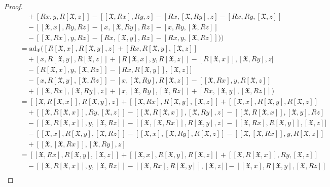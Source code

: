 \documentclass[12pt]{amsart}
\theoremstyle{definition}
\begin{document}
\begin{proof}
\begin{align*}
\quad&\quad +[Rx, y, R[\mathfrak{X}, z]]-[[\mathfrak{X},Rx], Ry, z] -[Rx, [\mathfrak{X},Ry], z]-[Rx, Ry, [\mathfrak{X},z]]\\
\quad&\quad-[[\mathfrak{X}, x], Ry, Rz]-[x, [\mathfrak{X}, Ry], Rz]-[x, Ry, [\mathfrak{X}, Rz]]\\
\quad&\quad-[[\mathfrak{X},Rx], y, Rz]-[Rx, [\mathfrak{X},y], Rz]-[Rx, y, [\mathfrak{X},Rz]])\Big)\\
&=\mathrm{ad}_\mathfrak{X}\Big( [R[\mathfrak{X}, x], R[\mathfrak{X}, y], z]+[Rx, R[\mathfrak{X}, y], [\mathfrak{X}, z]]\\
\quad&\quad+[x, R[\mathfrak{X}, y], R[\mathfrak{X}, z]]+[R[\mathfrak{X}, x], y, R[\mathfrak{X}, z]]-[ R[\mathfrak{X}, x]],[\mathfrak{X}, Ry], z]\\
\quad&\quad-[R[\mathfrak{X}, x], y, [\mathfrak{X}, Rz]]-[Rx, R[\mathfrak{X}, y]], [\mathfrak{X},z]]\\
\quad&\quad-[ x, R[\mathfrak{X}, y], [\mathfrak{X},Rz]]-[ x, [\mathfrak{X},Ry], R[\mathfrak{X}, z]]-[ [\mathfrak{X},Rx], y, R[\mathfrak{X}, z]]\\
\quad&\quad+[ [\mathfrak{X},Rx], [\mathfrak{X}, Ry], z]+[x,[\mathfrak{X}, Ry], [\mathfrak{X}, Rz]]+[Rx, [\mathfrak{X},y], [\mathfrak{X},Rz]]\Big)\\
&=[[\mathfrak{X},R[\mathfrak{X}, x]], R[\mathfrak{X}, y], z]+[[\mathfrak{X},Rx], R[\mathfrak{X}, y], [\mathfrak{X}, z]]+[[\mathfrak{X}, x], R[\mathfrak{X}, y], R[\mathfrak{X}, z]]\\
&\quad+[[\mathfrak{X}, R[\mathfrak{X}, x]], Ry, [\mathfrak{X}, z]]-[ [\mathfrak{X}, R[\mathfrak{X}, x]],[\mathfrak{X}, Ry], z]-[[\mathfrak{X}, R[\mathfrak{X}, x]],[\mathfrak{X}, y], Rz]\\
&\quad-[[\mathfrak{X}, R[\mathfrak{X}, x]], y, [\mathfrak{X}, Rz]]-[[\mathfrak{X}, [\mathfrak{X}, Rx]], R[\mathfrak{X}, y], z]-[[\mathfrak{X}, Rx], R[\mathfrak{X}, y]], [\mathfrak{X},z]]\\
&\quad-[[\mathfrak{X}, x], R[\mathfrak{X}, y], [\mathfrak{X},Rz]]-[[\mathfrak{X}, x], [\mathfrak{X},Ry], R[\mathfrak{X}, z]]-[[\mathfrak{X}, [\mathfrak{X},Rx]], y, R[\mathfrak{X}, z]]\\
&\quad+[[\mathfrak{X}, [\mathfrak{X},Rx]], [\mathfrak{X}, Ry], z]\\
&=[[\mathfrak{X},Rx], R[\mathfrak{X}, y], [\mathfrak{X}, z]]+[[\mathfrak{X}, x], R[\mathfrak{X}, y], R[\mathfrak{X}, z]]+[[\mathfrak{X}, R[\mathfrak{X}, x]], Ry, [\mathfrak{X}, z]]\\
&\quad-[[\mathfrak{X}, R[\mathfrak{X}, x]], y, [\mathfrak{X}, Rz]]-[[\mathfrak{X}, Rx], R[\mathfrak{X}, y]], [\mathfrak{X},z]]-[[\mathfrak{X}, x], R[\mathfrak{X}, y], [\mathfrak{X},Rz]]\\

\end{align*}
\end{proof}
\end{document}
